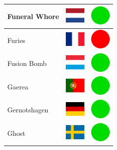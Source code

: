 \documentclass[12pt, a4paper, twoside]{report}
\begin{document}
\begin{center}
\begin{longtable}{|p{5cm}|p{2cm}|p{2cm}|}
Funeral Whore & \includegraphics[width=1cm]{4x3/nl} & \includegraphics[width=1cm]{likes/y} \\ \hline
Furies & \includegraphics[width=1cm]{4x3/fr} & \includegraphics[width=1cm]{likes/n} \\ \hline
Fusion Bomb & \includegraphics[width=1cm]{4x3/lu} & \includegraphics[width=1cm]{likes/y} \\ \hline
Gaerea & \includegraphics[width=1cm]{4x3/pt} & \includegraphics[width=1cm]{likes/y} \\ \hline
Gernotshagen & \includegraphics[width=1cm]{4x3/de} & \includegraphics[width=1cm]{likes/y} \\ \hline
Ghost & \includegraphics[width=1cm]{4x3/se} & \includegraphics[width=1cm]{likes/y} \\ \hline

\end{longtable}
\end{center}
\end{document}
